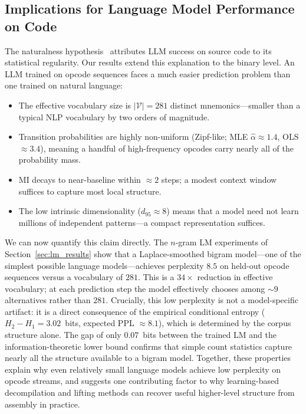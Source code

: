 \documentclass[10pt,twocolumn]{article}
\begin{document}
\subsection{Implications for Language Model Performance on Code}

The naturalness hypothesis~\cite{hindle2012naturalness} attributes LLM success
on source code to its statistical regularity.  Our results extend this
explanation to the binary level.  An LLM trained on opcode sequences faces a
much easier prediction problem than one trained on natural language:
\begin{itemize}
  \item The effective vocabulary size is $|\mathcal{V}| = 281$
        distinct mnemonics---smaller than a typical NLP vocabulary by two orders
        of magnitude.
  \item Transition probabilities are highly non-uniform (Zipf-like;
        MLE $\hat{\alpha} \approx 1.4$, OLS $\approx 3.4$), meaning a handful
        of high-frequency opcodes carry nearly all of the probability mass.
  \item MI decays to near-baseline within $\approx 2$ steps; a modest
        context window suffices to capture most local structure.
  \item The low intrinsic dimensionality ($d_{95} \approx 8$) means that
        a model need not learn millions of independent patterns---a compact
        representation suffices.
\end{itemize}
We can now quantify this claim directly.  The $n$-gram LM experiments of
Section~\ref{sec:lm_results} show that a Laplace-smoothed bigram model---one of
the simplest possible language models---achieves perplexity $8.5$ on held-out
opcode sequences versus a vocabulary of $281$.  This is a $34\times$ reduction
in effective vocabulary; at each prediction step the model effectively chooses
among $\sim\!9$ alternatives rather than $281$.  Crucially, this low perplexity
is not a model-specific artifact: it is a direct consequence of the empirical
conditional entropy ($H_2 - H_1 = 3.02$~bits, expected PPL $\approx 8.1$),
which is determined by the corpus structure alone.  The gap of only $0.07$~bits
between the trained LM and the information-theoretic lower bound confirms that
simple count statistics capture nearly all the structure available to a bigram
model.  Together, these properties explain why even relatively small language
models achieve low perplexity on opcode streams, and suggests one contributing
factor to why learning-based decompilation and lifting methods can recover
useful higher-level structure from assembly in practice.
\end{document}
